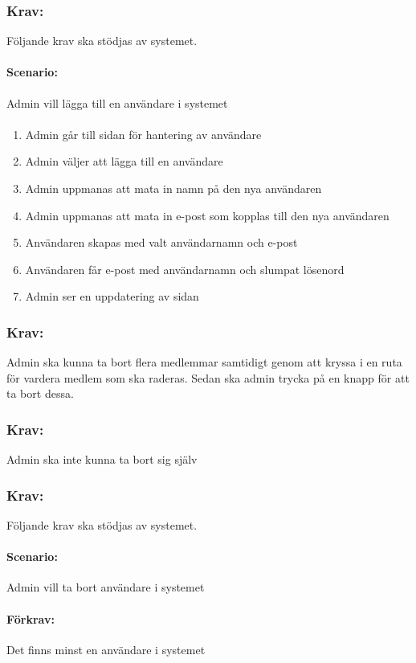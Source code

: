 \documentclass[paper=a4, fontsize=11pt,twoside]{article}
\begin{document}
\subsubsection{Krav:} Följande krav ska stödjas av systemet. 
\paragraph{Scenario:}
Admin vill lägga till en användare i systemet
\paragraph{}
\begin{enumerate}
\item Admin går till sidan för hantering av användare
\item Admin väljer att lägga till en användare
\item Admin uppmanas att mata in namn på den nya användaren
\item Admin uppmanas att mata in e-post som kopplas till den nya användaren
\item Användaren skapas med valt användarnamn och e-post
\item Användaren får e-post med användarnamn och slumpat lösenord
\item Admin ser en uppdatering av sidan
\end{enumerate}

\subsubsection{Krav:} Admin ska kunna ta bort flera medlemmar samtidigt genom att kryssa i en ruta för vardera medlem som ska raderas. Sedan ska admin trycka på en knapp för att ta bort dessa.
\subsubsection{Krav:} Admin ska inte kunna ta bort sig själv

\subsubsection{Krav:} Följande krav ska stödjas av systemet. 
\paragraph{Scenario:}
Admin vill ta bort användare i systemet
\paragraph{Förkrav:}
Det finns minst en användare i systemet
\end{document}
